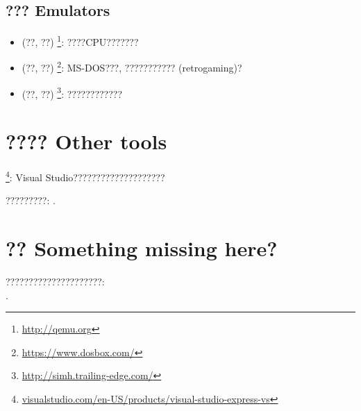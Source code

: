 
\subsection{??? Emulators}

\begin{itemize}
\item (??, ??) \footnote{\url{http://qemu.org}}: ????CPU???????

\item (??, ??) \footnote{\url{https://www.dosbox.com/}}: MS-DOS???, ??????????? (retrogaming)?

\item (??, ??) \footnote{\url{http://simh.trailing-edge.com/}}: ????????????
\end{itemize}

\section{???? Other tools}

\footnote{\href{http://go.yurichev.com/17034}{visualstudio.com/en-US/products/visual-studio-express-vs}}:
Visual Studio????????????????????

?????????: .

\section{?? Something missing here?}

?????????????????????:\\
\TT{\EMAIL}.


